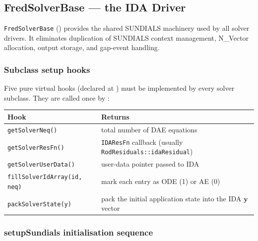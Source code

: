 \documentclass[11pt,a4paper]{article}
\begin{document}
\subsection{FredSolverBase — the IDA Driver}
\label{sec:solver_base}

\texttt{FredSolverBase} () provides the shared SUNDIALS machinery used by all solver drivers.  It eliminates duplication of SUNDIALS context management, N\_Vector allocation, output storage, and gap-event handling.

\subsubsection*{Subclass setup hooks}

Five pure virtual hooks (declared at ) must be implemented by every solver subclass.  They are called once by :

\begin{center}
\begin{tabular}{ll}
  \toprule
  Hook & Returns \\
  \midrule
  \texttt{getSolverNeq()}      & total number of DAE equations \\
  \texttt{getSolverResFn()}    & \texttt{IDAResFn} callback (usually \texttt{RodResiduals::idaResidual}) \\
  \texttt{getSolverUserData()} & user-data pointer passed to IDA \\
  \texttt{fillSolverIdArray(id, neq)} & mark each entry as ODE (1) or AE (0) \\
  \texttt{packSolverState(y)}  & pack the initial application state into the IDA $\mathbf{y}$ vector \\
  \bottomrule
\end{tabular}
\end{center}

\subsubsection*{setupSundials initialisation sequence}
\end{document}

